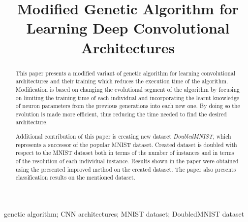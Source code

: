 \documentclass[eng]{simposium}
\begin{document}
\begin{frontmatter}


\title{Modified Genetic Algorithm for Learning Deep Convolutional Architectures}

\author{\textbf{ }}
\address{Faculty of Mathematics, University of Belgrade, Studentski trg 16, 11000 Belgrade\\
}
\author{\textbf{ }}
\address{Microsoft Development Center Serbia, Španskih boraca 3, 11000 Belgrade\\
}
\author{\textbf{ }}
\address{Faculty of Mathematics, University of Belgrade, Studentski trg 16, 11000 Belgrade\\
}


\maketitle
\begin{abstract}

This paper presents a modified variant of genetic algorithm for learning convolutional architectures and their training which reduces the execution time of the algorithm.  
Modification is based on changing the evolutional segment of the algorithm by focusing on limiting the training time of each individual and incorporating the  
learnt knowledge of neuron parameters from the previous generations into each new one. By doing so the evolution is made more efficient, thus reducing the time  
needed to find the desired architecture. 

Additional contribution of this paper is creating new dataset \textit{DoubledMNIST}, which represents a successor of the popular MNIST dataset. 
Created dataset is doubled with respect to the MNIST dataset both in terms of the number of instances and in terms of the resolution of each individual instance. 
Results shown in the paper were obtained using the presented improved method on the created dataset. The paper also presents classification results on the mentioned dataset. 
\end{abstract} 

\begin{keyword} 
genetic algorithm; CNN architectures; MNIST dataset; DoubledMNIST dataset 
\end{keyword} 

\end{frontmatter} 
\end{document}
